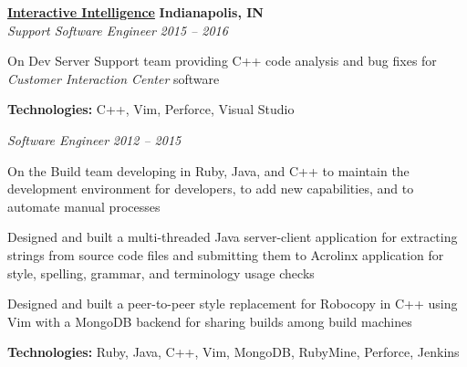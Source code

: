 %
    \headerrow
        {\textbf{\href{https://www.genesys.com/inin}{Interactive Intelligence}}}
        {\textbf{Indianapolis, IN}}
    \\
    \headerrow
        {\emph{Support Software Engineer}}
        {\emph{2015 -- 2016}}
    \begin{itemize*}
        \item On Dev Server Support team providing C++ code analysis and bug fixes for \emph{Customer Interaction Center} software
    \end{itemize*}

    \hspace{1.0em}
    \textbf{Technologies:} C++, Vim, Perforce, Visual Studio

    \vspace{0.3em}

    \headerrow
        {\emph{Software Engineer}}
        {\emph{2012 -- 2015}}
    \begin{itemize*}
        \item On the Build team developing in Ruby, Java, and C++ to maintain the development environment for developers,
            to add new capabilities, and to automate manual processes
         \item Designed and built a multi-threaded Java server-client application for extracting strings from
                source code files and submitting them to Acrolinx application for style, spelling, grammar, and terminology
                usage checks
        \item Designed and built a peer-to-peer style replacement for Robocopy in C++ using Vim with a MongoDB backend
                for sharing builds among build machines
    \end{itemize*}

    \hspace{1.0em}
    \textbf{Technologies:} Ruby, Java, C++, Vim, MongoDB, RubyMine, Perforce, Jenkins

